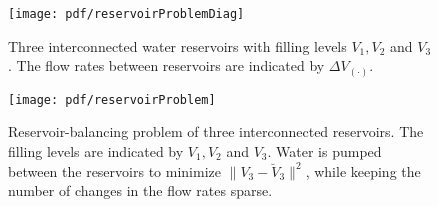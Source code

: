 \documentclass[conference]{IEEEtran}
\newcommand{\bma}{\begin{bmatrix}}
\newcommand{\ema}{\end{bmatrix}}
\newcommand{\T}{{\mathsf{T}}} %
\begin{document}

\begin{figure}
\centering
\texttt{[image: pdf/reservoirProblemDiag]}
\caption{Three interconnected water reservoirs with filling levels $V_1, V_2$
and $V_3$. The flow rates between reservoirs are indicated by 
$\Delta V_{(\cdot)}$.}
\label{fig:reservoirProblemDiag}
\end{figure}

\begin{figure}
\texttt{[image: pdf/reservoirProblem]}
\caption{Reservoir-balancing problem of three interconnected reservoirs. The
filling levels are indicated by $V_1, V_2$ and $V_3$. Water is pumped between
the reservoirs to minimize $\| V_3 - \breve V_3\|^2$, while keeping the number
of changes in the flow rates sparse.}
\label{fig:reservoirProblem}
\end{figure}


\balance


\end{document}
